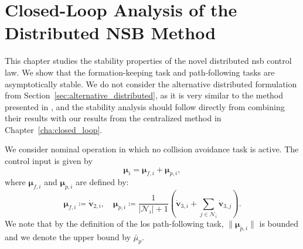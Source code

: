 \chapter{Closed-Loop Analysis of the Distributed NSB Method}\label{cha:distributed_closed_loop}
\vspace{-2mm}
This chapter studies the stability properties of the novel distributed \gls{nsb} control law. We show that the formation-keeping task and path-following tasks are asymptotically stable. We do not consider the alternative distributed formulation from Section~\ref{sec:alternative_distributed}, as it is very similar to the method presented in \cite{matous_formation_2023}, and the stability analysis should follow directly from combining their results with our results from the centralized method in Chapter~\ref{cha:closed_loop}.

We consider nominal operation in which no collision avoidance task is active. The control input is given by 
\begin{equation}
    \bm{\mu}_i = \bm{\mu}_{f,i} + \bm{\mu}_{p,i},
\end{equation}
where $\bm{\mu}_{f,i}$ and $\bm{\mu}_{p,i}$ are defined by:
\begin{equation}\label{eq:distributed_applied_accelerations}
    \bm{\mu}_{f,i} \coloneqq \dot{\mathbf{v}}_{2,i}, \quad \bm{\mu}_{p,i} \coloneqq \frac{1}{|\mathcal{N}_i|+1}\left(\dot{\mathbf{v}}_{3,i}+\sum_{j\in\mathcal{N}_i} \dot{\mathbf{v}}_{3,j}\right).
\end{equation}
We note that by the definition of the \gls{los} path-following task, $\|\bm{\mu}_{p,i}\|$ is bounded and we denote the upper bound by $\bar{\mu}_p$. 


